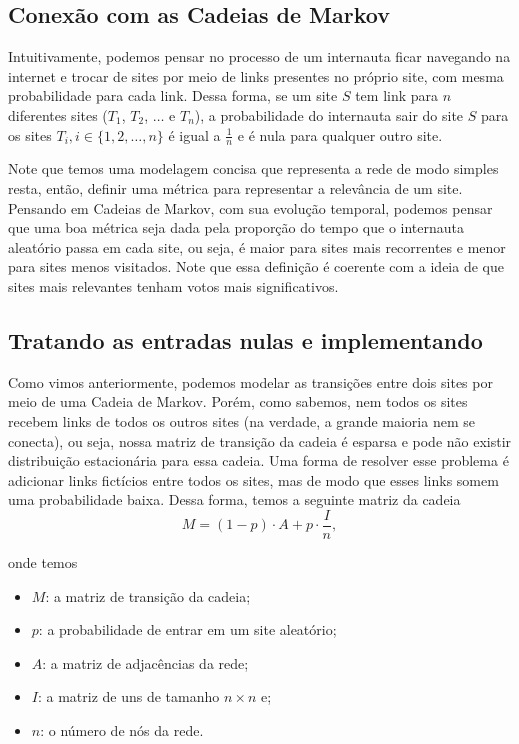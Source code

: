 \documentclass{article}
\begin{document}
\subsection*{Conexão com as Cadeias de Markov}

Intuitivamente, podemos pensar no processo de um internauta ficar navegando na internet e trocar de sites por meio de links presentes no próprio site, com mesma probabilidade para cada link. Dessa forma, se um site $S$ tem link para $n$ diferentes sites ($T_1$, $T_2$, $\dots$ e $T_n$), a probabilidade do internauta sair do site $S$ para os sites $T_i, i \in \{1, 2, \dots, n\}$ é igual a $\frac{1}{n}$ e é nula para qualquer outro site.

Note que temos uma modelagem concisa que representa a rede de modo simples resta, então, definir uma métrica para representar a relevância de um site. Pensando em Cadeias de Markov, com sua evolução temporal, podemos pensar que uma boa métrica seja dada pela proporção do tempo que o internauta aleatório passa em cada site, ou seja, é maior para sites mais recorrentes e menor para sites menos visitados. Note que essa definição é coerente com a ideia de que sites mais relevantes tenham votos mais significativos.


\subsection*{Tratando as entradas nulas e implementando}

Como vimos anteriormente, podemos modelar as transições entre dois sites por meio de uma Cadeia de Markov. Porém, como sabemos, nem todos os sites recebem links de todos os outros sites (na verdade, a grande maioria nem se conecta), ou seja, nossa matriz de transição da cadeia é esparsa e pode não existir distribuição estacionária para essa cadeia. Uma forma de resolver esse problema é adicionar links fictícios entre todos os sites, mas de modo que esses links somem uma probabilidade baixa. Dessa forma, temos a seguinte matriz da cadeia
\[M = (1 - p)\cdot A + p\cdot \dfrac{I}{n},\]

\noindent onde temos
\begin{itemize}
    \item
        $M$: a matriz de transição da cadeia;
        
    \item
        $p$: a probabilidade de entrar em um site aleatório;
        
    \item
        $A$: a matriz de adjacências da rede;
        
    \item
        $I$: a matriz de uns de tamanho $n\times n$ e;
        
    \item
        $n$: o número de nós da rede.
\end{itemize}
\end{document}
